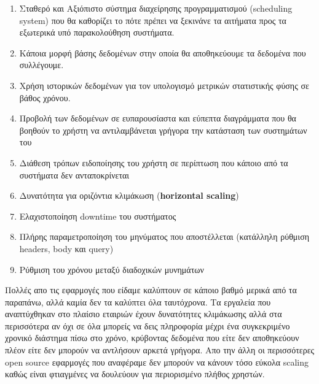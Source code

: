 \begin{enumerate}
	\item Σταθερό και Αξιόπιστο σύστημα διαχείρησης προγραμματισμού (scheduling system) που θα
		καθορίζει το πότε πρέπει να ξεκινάνε τα αιτήματα προς τα εξωτερικά υπό παρακολούθηση συστήματα.
	\item Κάποια μορφή βάσης δεδομένων στην οποία θα αποθηκεύουμε τα δεδομένα που συλλέγουμε.
	\item Χρήση ιστορικών δεδομένων για τον υπολογισμό μετρικών στατιστικής φύσης σε βάθος χρόνου.
	\item Προβολή των δεδομένων σε ευπαρουσίαστα και εύπεπτα διαγράμματα που θα βοηθούν το χρήστη να αντιλαμβάνεται
		γρήγορα την κατάσταση των συστημάτων του
	\item Διάθεση τρόπων ειδοποίησης του χρήστη σε περίπτωση που κάποιο από τα συστήματα δεν ανταποκρίνεται
	\item Δυνατότητα για οριζόντια κλιμάκωση (\textbf{horizontal scaling})
	\item Ελαχιστοποίηση downtime του συστήματος 
	\item Πλήρης παραμετροποίηση του μηνύματος που αποστέλλεται (κατάλληλη ρύθμιση headers, body και query)
	\item Ρύθμιση του χρόνου μεταξύ διαδοχικών μυνημάτων
\end{enumerate}

Πολλές απο τις εφαρμογές που είδαμε καλύπτουν σε κάποιο βαθμό μερικά από τα παραπάνω, αλλά καμία
δεν τα καλύπτει όλα ταυτόχρονα. Τα εργαλεία που αναπτύχθηκαν στο πλαίσιο εταιριών έχουν δυνατότητες κλιμάκωσης
αλλά στα περισσότερα αν όχι σε όλα μπορείς να δεις πληροφορία μέχρι ένα συγκεκριμένο χρονικό διάστημα πίσω στο χρόνο,
κρύβοντας δεδομένα που είτε δεν αποθηκεύουν πλέον είτε δεν μπορούν να αντλήσουν αρκετά γρήγορα.
Απο την άλλη οι περισσότερες open source εφαρμογές που αναφέραμε δεν μπορούν να κάνουν τόσο εύκολα scaling
καθώς είναι φτιαγμένες να δουλεύουν για περιορισμένο πλήθος χρηστών. 

